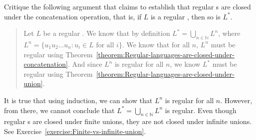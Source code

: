 \begin{flex}
\begin{exercise} \label{exercise:Regular-languages-are-closed-under-star}
Critique the following argument that claims to establish that regular s are closed under the concatenation operation, that is, if $L$ is a regular , then so is $L^*$.
\begin{quote}
Let $L$ be a regular . We know that by definition $L^* = \bigcup_{n \in \mathbb{N}} L^n$, where $L^n = \{u_1 u_2 \ldots u_n : u_i \in L \text{ for all $i$} \}$. We know that for all $n$, $L^n$ must be regular using Theorem~\ref{theorem:Regular-languages-are-closed-under-concatenation}. And since $L^n$ is regular for all $n$, we know $L^*$ must be regular using Theorem~\ref{theorem:Regular-languages-are-closed-under-union}.
\end{quote}
\end{exercise}

\begin{solution}
It is true that using induction, we can show that $L^n$ is regular for all $n$. However, from there, we cannot conclude that $L^* = \bigcup_{n \in \mathbb{N}} L^n$ is regular. Even though regular s are closed under finite unions, they are not closed under infinite unions. See Exercise~\ref{exercise:Finite-vs-infinite-union}.

\end{solution}
\end{flex}




